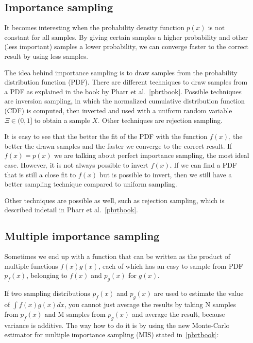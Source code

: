 \documentclass[11pt,a4paper]{report}
\begin{document}
\subsection{Importance sampling}
\label{section_importance_sampling}

It becomes interesting when the probability density function $p(x)$ is not constant for all samples. By giving certain samples a higher probability and other (less important) samples a lower probability, we can converge faster to the correct result by using less samples.

The idea behind importance sampling is to draw samples from the probability distribution function (PDF). There are different techniques to draw samples from a PDF as explained in the book by Pharr et al.~\ref{pbrtbook}. Possible techniques are inversion sampling, in which the normalized cumulative distribution function (CDF) is computed, then inverted and used with a uniform random variable $\Xi \in (0, 1]$ to obtain a sample $X$. Other techniques are rejection sampling.
 
It is easy to see that the better the fit of the PDF with the function $f(x)$, the better the drawn samples and the faster we converge to the correct result. If $f(x) = p(x)$ we are talking about perfect importance sampling, the most ideal case. However, it is not always possible to invert $f(x)$. If we can find a PDF that is still a close fit to $f(x)$ but is possible to invert, then we still have a better sampling technique compared to uniform sampling.

Other techniques are possible as well, such as rejection sampling, which is described indetail in Pharr et al.~\ref{pbrtbook}.

\subsection{Multiple importance sampling}

Sometimes we end up with a function that can be written as the product of multiple functions $f(x)g(x)$, each of which has an easy to sample from PDF $p_f(x)$, belonging to $f(x)$ and $p_g(x)$ for $g(x)$.

If two sampling distributions $p_f(x)$ and $p_g(x)$ are used to estimate the value of $\int f(x)g(x) dx$, you cannot just average the results by taking N samples from $p_f(x)$ and M samples from $p_g(x)$ and average the result, because variance is additive. The way how to do it is by using the new Monte-Carlo estimator for multiple importance sampling (MIS) stated in~\ref{pbrtbook}: 
\end{document}

